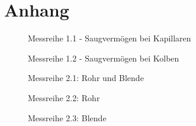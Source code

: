 \documentclass[12pt, a4paper]{scrartcl}
\begin{document}
    \newpage
    \section{Anhang}
    
    \begin{figure}[H]
        \centering
        
        \caption{Messreihe 1.1 - Saugvermögen bei Kapillaren}
        \label{m11}
    \end{figure}

   	\begin{figure}[H]
        \centering
        
        \caption{Messreihe 1.2 - Saugvermögen bei Kolben}
        \label{m12}
    \end{figure}

    \begin{figure}[H]
        \centering
        
        \caption{Messreihe 2.1: Rohr und Blende}
        \label{m21}
    \end{figure}

    \begin{figure}[H]
        \centering
        
        \caption{Messreihe 2.2: Rohr}
        \label{m22}
    \end{figure}

    \begin{figure}[H]
        \centering
        
        \caption{Messreihe 2.3: Blende}
        \label{m23}
    \end{figure} 
\end{document}
